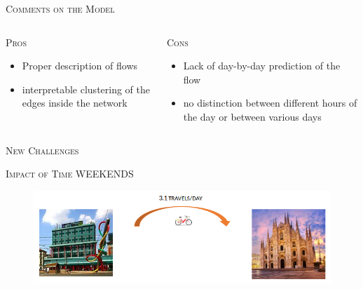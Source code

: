 \documentclass{beamer}
\begin{document}
\begin{frame}{\textsc{Comments on the Model}}
\begin{columns}[c]
	\hspace{6pt}
	\begin{column}{0.5\textwidth}
		\alert{\textsc{Pros}}\\
		\begin{itemize}
			\item Proper \alert{description of flows}
			\item \alert{interpretable clustering} of the edges inside the network
		\end{itemize}
	\end{column}
	\hspace{5pt}
	\vrule{}
	\hspace{8pt}
	\begin{column}{0.50\textwidth}
		\alert{\textsc{Cons}}\\
		\begin{itemize}
			\item Lack of \alert{day-by-day prediction} of the flow
			\item no distinction between different hours of the day or between various days
		\end{itemize}
	\end{column}
\end{columns}

\end{frame}

\begin{frame}{\textsc{New Challenges}}
\begin{itemize}
\end{itemize}
\end{frame}

\begin{frame}{\textsc{Impact of Time}}
  WEEKENDS
	\begin{figure}[H]
		\centering
		\includegraphics[width=\linewidth]{pictures/WeekEnd.png} 
		\label{fig1}
	\end{figure}
\end{frame}
\end{document}
